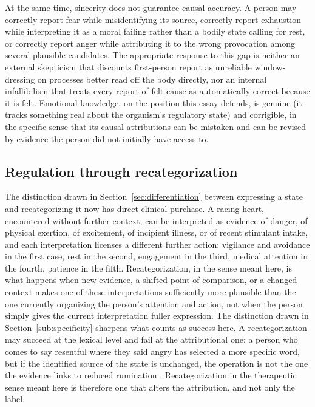 \documentclass[11pt]{article}
\begin{document}
At the same time, sincerity does not guarantee causal accuracy. A person may correctly report fear while misidentifying its source, correctly report exhaustion while interpreting it as a moral failing rather than a bodily state calling for rest, or correctly report anger while attributing it to the wrong provocation among several plausible candidates. The appropriate response to this gap is neither an external skepticism that discounts first-person report as unreliable window-dressing on processes better read off the body directly, nor an internal infallibilism that treats every report of felt cause as automatically correct because it is felt. Emotional knowledge, on the position this essay defends, is genuine (it tracks something real about the organism's regulatory state) and corrigible, in the specific sense that its causal attributions can be mistaken and can be revised by evidence the person did not initially have access to.

\subsection{Regulation through recategorization}

The distinction drawn in Section~\ref{sec:differentiation} between expressing a state and recategorizing it now has direct clinical purchase. A racing heart, encountered without further context, can be interpreted as evidence of danger, of physical exertion, of excitement, of incipient illness, or of recent stimulant intake, and each interpretation licenses a different further action: vigilance and avoidance in the first case, rest in the second, engagement in the third, medical attention in the fourth, patience in the fifth. Recategorization, in the sense meant here, is what happens when new evidence, a shifted point of comparison, or a changed context makes one of these interpretations sufficiently more plausible than the one currently organizing the person's attention and action, not when the person simply gives the current interpretation fuller expression. The distinction drawn in Section~\ref{sub:specificity} sharpens what counts as success here. A recategorization may succeed at the lexical level and fail at the attributional one: a person who comes to say resentful where they said angry has selected a more specific word, but if the identified source of the state is unchanged, the operation is not the one the evidence links to reduced rumination \citep{LunsfordEddington2026}. Recategorization in the therapeutic sense meant here is therefore one that alters the attribution, and not only the label.
\end{document}
